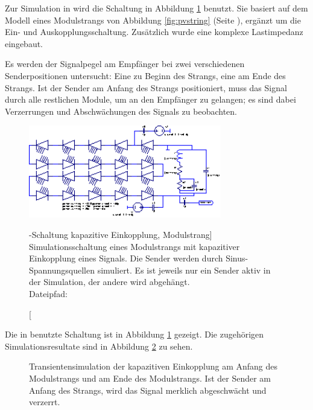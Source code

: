 Zur   Simulation   in     wird   die   Schaltung  in   Abbildung
\ref{fig:ltspice:capacitive:string} benutzt. Sie basiert  auf dem Modell eines
Modulstrangs von Abbildung  \ref{fig:pvstring} (Seite \pageref{fig:pvstring}),
erg\"anzt  um  die  Ein-  und  Auskopplungsschaltung. Zus\"atzlich  wurde  eine
komplexe Lastimpedanz eingebaut.

Es   werden   der   Signalpegel   am  Empf\"anger   bei   zwei   verschiedenen
Senderpositionen  untersucht: Eine zu  Beginn des  Strangs, eine  am Ende  des
Strangs. Ist der  Sender am Anfang  des Strangs positioniert, muss  das Signal
durch alle restlichen Module, um an den Empf\"anger zu gelangen; es sind dabei
Verzerrungen und Abschw\"achungen des Signals zu beobachten.


\begin{figure}[h!tb]
    \centering
    \includegraphics[width=0.75\textwidth]{images/ltspice/jac/capacitive.eps}
    \caption
    [-Schaltung kapazitive Einkopplung, Modulstrang]
    {%
        Simulationsschaltung     eines     Modulstrangs    mit     kapazitiver
        Einkopplung    eines    Signals.
        Die  Sender  werden  durch  Sinus-Spannungsquellen  simuliert. Es  ist
        jeweils  nur ein  Sender  aktiv  in der  Simulation,  der andere  wird
        abgeh\"angt.\protect\\
        Dateipfad: %
    }
    \label{fig:ltspice:capacitive:string}
\end{figure}

Die    in        benutzte    Schaltung    ist    in    Abbildung
\ref{fig:ltspice:capacitive:string}      gezeigt.       Die      zugeh\"origen
Simulationsresultate   sind    in   Abbildung   \ref{fig:simu:capacitive:tran}
zu sehen.%

\begin{figure}[h!tb]
    
    \caption[Simulationsergebnisse kapazitive Einkopplung, Modulstrang]{%
        Transientensimulation  der  kapazitiven   Einkopplung  am  Anfang  des
        Modulstrangs und  am Ende des  Modulstrangs. Ist der Sender  am Anfang
        des Strangs, wird das Signal merklich abgeschw\"acht und verzerrt.%
    }
    \label{fig:simu:capacitive:tran}
\end{figure}


